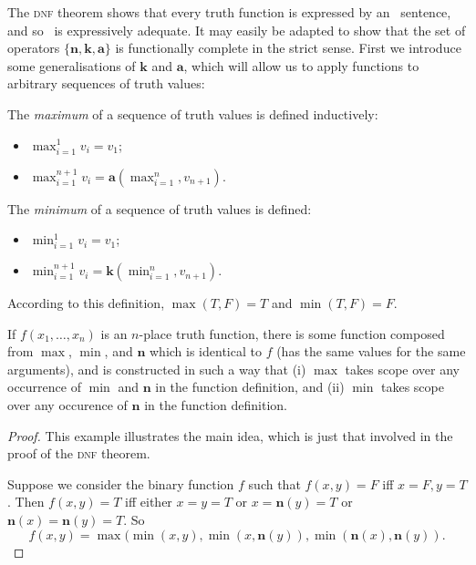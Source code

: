 The \textsc{dnf} theorem shows that every truth function is expressed by an \lone\ sentence, and so \lone\ is expressively adequate. It may easily be adapted to show that the set of operators $\{\mathbf{n},\mathbf{k},\mathbf{a}\}$ is functionally complete in the strict sense. First we introduce some generalisations of $\mathbf{k}$ and $\mathbf{a}$, which will allow us to apply functions to arbitrary sequences of truth values: \begin{definition} The \emph{maximum} of a sequence of truth values is defined inductively: \begin{itemize}
	\item $\max_{i=1}^{1} v_{i} = v_{1}$;
	\item $\max_{i=1}^{n+1} v_{i} = \textbf{a}(\max_{i=1}^{n},v_{n+1})$.
\end{itemize}

The \emph{minimum} of a sequence of truth values is defined: \begin{itemize}
	\item $\min_{i=1}^{1} v_{i} = v_{1}$;
	\item $\min_{i=1}^{n+1} v_{i} = \textbf{k}(\min_{i=1}^{n},v_{n+1})$.
\end{itemize}
\end{definition}
According to this definition, $\max(T,F) = T$ and $\min(T,F)=F$.


\begin{theorem}If $f(x_{1},\ldots,x_{n})$ is an $n$-place truth function, there is some function composed from $\max$, $\min$, and $\mathbf{n}$ which is identical to $f$ (has the same values for the same arguments), and is constructed in such a way that (i) $\max$ takes scope over any occurrence of $\min$ and $\mathbf{n}$ in the function definition, and (ii) $\min$ takes scope over any occurence of $\mathbf{n}$ in the function definition.\end{theorem}
	\begin{proof}
This example illustrates the main idea, which is just that involved in the proof of the \textsc{dnf} theorem.

Suppose we consider the binary function $f$ such that $f(x,y)=F$ iff $x=F,y=T$. Then $f(x,y)=T$ iff either $x=y=T$ or $x=\mathbf{n}(y)=T$ or $\mathbf{n}(x)=\mathbf{n}(y)=T$. So \[f(x,y) = \max(\min(x,y),\min(x,\mathbf{n}(y)),\min(\mathbf{n}(x),\mathbf{n}(y)).\] 
\end{proof}


